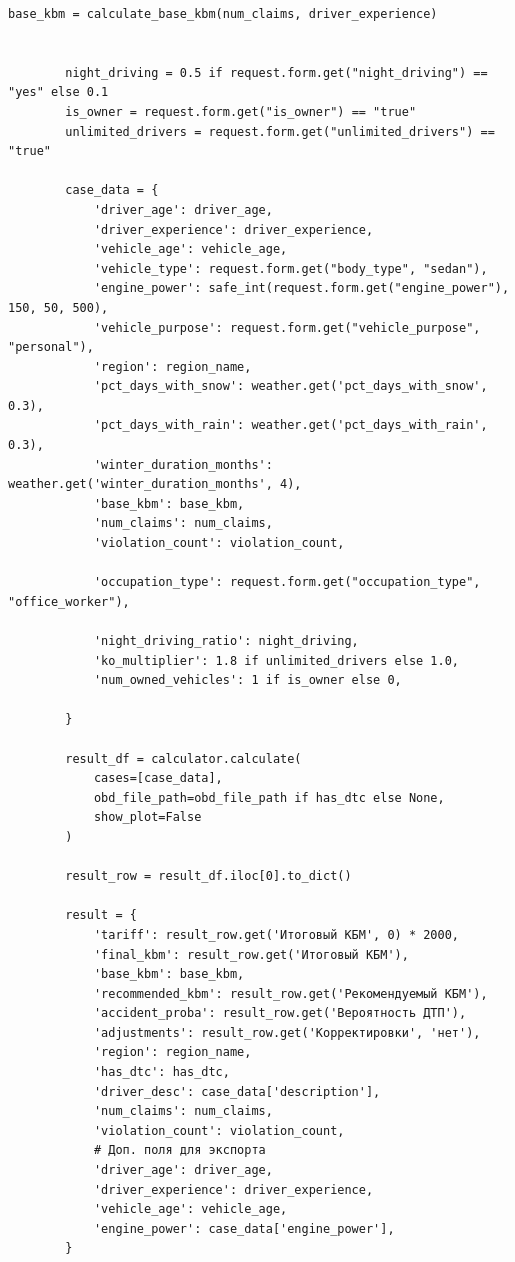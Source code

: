 \begin{lstlisting}[caption={Реализация эндпоинтов Flask}, label={lst:routes}    breaklines=true,
    breakatwhitespace=true,
    breakindent=10pt,
    columns=fullflexible
]
        base_kbm = calculate_base_kbm(num_claims, driver_experience)


        night_driving = 0.5 if request.form.get("night_driving") == "yes" else 0.1
        is_owner = request.form.get("is_owner") == "true"
        unlimited_drivers = request.form.get("unlimited_drivers") == "true"

        case_data = {
            'driver_age': driver_age,
            'driver_experience': driver_experience,
            'vehicle_age': vehicle_age,
            'vehicle_type': request.form.get("body_type", "sedan"),
            'engine_power': safe_int(request.form.get("engine_power"), 150, 50, 500),
            'vehicle_purpose': request.form.get("vehicle_purpose", "personal"),
            'region': region_name,
            'pct_days_with_snow': weather.get('pct_days_with_snow', 0.3),
            'pct_days_with_rain': weather.get('pct_days_with_rain', 0.3),
            'winter_duration_months': weather.get('winter_duration_months', 4),
            'base_kbm': base_kbm,
            'num_claims': num_claims,
            'violation_count': violation_count,

            'occupation_type': request.form.get("occupation_type", "office_worker"),

            'night_driving_ratio': night_driving,
            'ko_multiplier': 1.8 if unlimited_drivers else 1.0,
            'num_owned_vehicles': 1 if is_owner else 0,

        }

        result_df = calculator.calculate(
            cases=[case_data],
            obd_file_path=obd_file_path if has_dtc else None,
            show_plot=False
        )
        
        result_row = result_df.iloc[0].to_dict()
        
        result = {
            'tariff': result_row.get('Итоговый КБМ', 0) * 2000,
            'final_kbm': result_row.get('Итоговый КБМ'),
            'base_kbm': base_kbm,
            'recommended_kbm': result_row.get('Рекомендуемый КБМ'),
            'accident_proba': result_row.get('Вероятность ДТП'),
            'adjustments': result_row.get('Корректировки', 'нет'),
            'region': region_name,
            'has_dtc': has_dtc,
            'driver_desc': case_data['description'],
            'num_claims': num_claims,
            'violation_count': violation_count,
            # Доп. поля для экспорта
            'driver_age': driver_age,
            'driver_experience': driver_experience,
            'vehicle_age': vehicle_age,
            'engine_power': case_data['engine_power'],
        }


\end{lstlisting}
